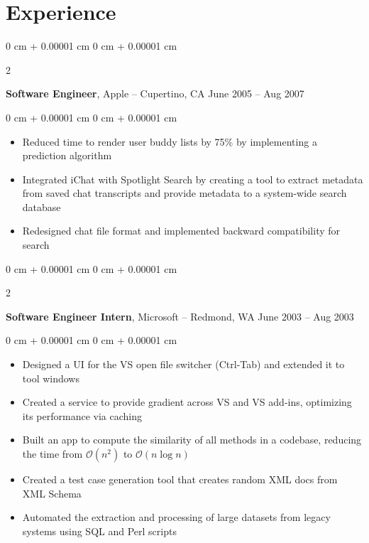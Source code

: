 \documentclass[10pt, letterpaper]{article}
\newenvironment{highlights}{
    \begin{itemize}[
        topsep=0.10 cm,
        parsep=0.10 cm,
        partopsep=0pt,
        itemsep=0pt,
        leftmargin=0 cm + 10pt
    ]
}{
    \end{itemize}
} %
\newenvironment{onecolentry}{
    \begin{adjustwidth}{
        0 cm + 0.00001 cm
    }{
        0 cm + 0.00001 cm
    }
}{
    \end{adjustwidth}
} %
\newenvironment{twocolentry}[2][]{
    \onecolentry
    \def\secondColumn{#2}
    \setcolumnwidth{\fill, 4.5 cm}
    \begin{paracol}{2}
}{
    \switchcolumn \raggedleft \secondColumn
    \end{paracol}
    \endonecolentry
} %
\begin{document}
    
    \section{Experience}



        
        \begin{twocolentry}{
            June 2005 – Aug 2007
        }
            \textbf{Software Engineer}, Apple -- Cupertino, CA\end{twocolentry}

        \vspace{0.10 cm}
        \begin{onecolentry}
            \begin{highlights}
                \item Reduced time to render user buddy lists by 75\% by implementing a prediction algorithm
                \item Integrated iChat with Spotlight Search by creating a tool to extract metadata from saved chat transcripts and provide metadata to a system-wide search database
                \item Redesigned chat file format and implemented backward compatibility for search
            \end{highlights}
        \end{onecolentry}


        \vspace{0.2 cm}

        \begin{twocolentry}{
            June 2003 – Aug 2003
        }
            \textbf{Software Engineer Intern}, Microsoft -- Redmond, WA\end{twocolentry}

        \vspace{0.10 cm}
        \begin{onecolentry}
            \begin{highlights}
                \item Designed a UI for the VS open file switcher (Ctrl-Tab) and extended it to tool windows
                \item Created a service to provide gradient across VS and VS add-ins, optimizing its performance via caching
                \item Built an app to compute the similarity of all methods in a codebase, reducing the time from $\mathcal{O}(n^2)$ to $\mathcal{O}(n \log n)$
                \item Created a test case generation tool that creates random XML docs from XML Schema
                \item Automated the extraction and processing of large datasets from legacy systems using SQL and Perl scripts
            \end{highlights}
        \end{onecolentry}
\end{document}
